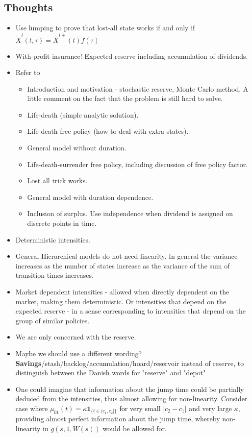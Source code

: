 \documentclass[12pt]{article}
\newcommand{\indic}[1]{\mathds{1}_{ \{ #1 \} }}
\theoremstyle{my_thm}
\theoremstyle{my_rem}
\begin{document}
\subsection{Thoughts}
\begin{itemize}
\item Use lumping to prove that lost-all state works if and only if $\tilde{X}^i(t,\tau) = \tilde{X}^{i+}(t)f(\tau)$
\item With-profit insurance! Expected reserve including accumulation of dividends.
\item Refer to \citet{Norberg}
\begin{itemize}
\item Introduction and motivation - stochastic reserve, Monte Carlo method. A little comment on the fact that the problem is still hard to solve.
\item Life-death (simple analytic solution).
\item Life-death free policy (how to deal with extra states).
\item General model without duration.
\item Life-death-surrender free policy, including discussion of free policy factor.
\item Lost all trick works.
\item General model with duration dependence.
\item Inclusion of surplus. Use independence when dividend is assigned on discrete points in time.
\end{itemize}
\item Deterministic intensities.
\item General Hierarchical models do not need linearity. In general the variance increases as the number of states increase as the variance of the sum of transition times increases.
\item Market dependent intensities - allowed when directly dependent on the market, making them deterministic. Or intensities that depend on the expected reserve - in a sense corresponding to intensities that depend on the group of similar policies.
\item We are only concerned with the reserve.
\item Maybe we should use a different wording? \textbf{Savings}/stash/backlog/accumulation/hoard/reservoir instead of reserve, to distinguish between the Danish words for "reserve" and "depot"
\item One could imagine that information about the jump time could be partially deduced from the intensities, thus almost allowing for non-linearity. Consider case where $\mu_{01}(t)= \kappa \indic{t \in (c_1,c_2]}$ for very small $|c_2-c_1|$ and very large $\kappa$, providing almost perfect information about the jump time, whereby non-linearity in $g(s,1,W(s))$ would be allowed for.

\end{itemize}
\end{document}

